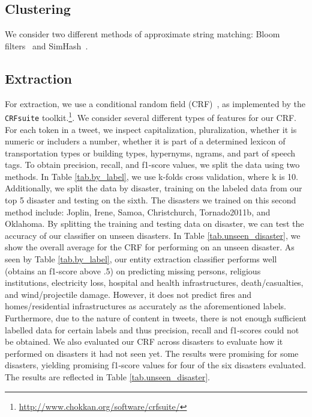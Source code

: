 \documentclass{article}
\begin{document}
\subsection{Clustering}
We consider two different methods of approximate string matching: Bloom
filters~\cite{bloom70space} and SimHash~\cite{charikar02similarity}.


\subsection{Extraction}
For extraction, we use a conditional random field (CRF)~\cite{sutton12intro}, as
implemented by the {\tt CRFsuite}
toolkit.\footnote{\url{http://www.chokkan.org/software/crfsuite/}}. We consider several different types of features for our CRF. For each token in a tweet, we inspect capitalization, pluralization, whether it is numeric or includers a number, whether it is part of a determined lexicon of transportation types or building types, hypernyms, ngrams, and part of speech tags. 
To obtain precision, recall, and f1-score values, we split the data using two methods. In Table \ref{tab.by_label}, we use k-folds cross validation, where k is 10. Additionally, we split the data by disaster, training on the labeled data from our top 5 disaster and testing on the sixth. The disasters we trained on this second method include: Joplin, Irene, Samoa, Christchurch, Tornado2011b, and Oklahoma. By splitting the training and testing data on disaster, we can test the accuracy of our classifier on unseen disasters. In Table \ref{tab.unseen_disaster}, we show the overall average for the CRF for performing on an unseen disaster.
As seen by Table \ref{tab.by_label}, our entity extraction classifier performs well (obtains an f1-score above .5) on predicting missing persons, religious institutions, electricity loss, hospital and health infrastructures, death/casualties, and wind/projectile damage. However, it does not predict fires and homes/residential infrastructures as accurately as the aforementioned labels. Furthermore, due to the nature of content in tweets, there is not enough sufficient labelled data for certain labels and thus precision, recall and f1-scores could not be obtained.
We also evaluated our CRF across disasters to evaluate how it performed on disasters it had not seen yet. The results were promising for some disasters, yielding promising f1-score values for four of the six disasters evaluated. The results are reflected in Table \ref{tab.unseen_disaster}.
\end{document}
